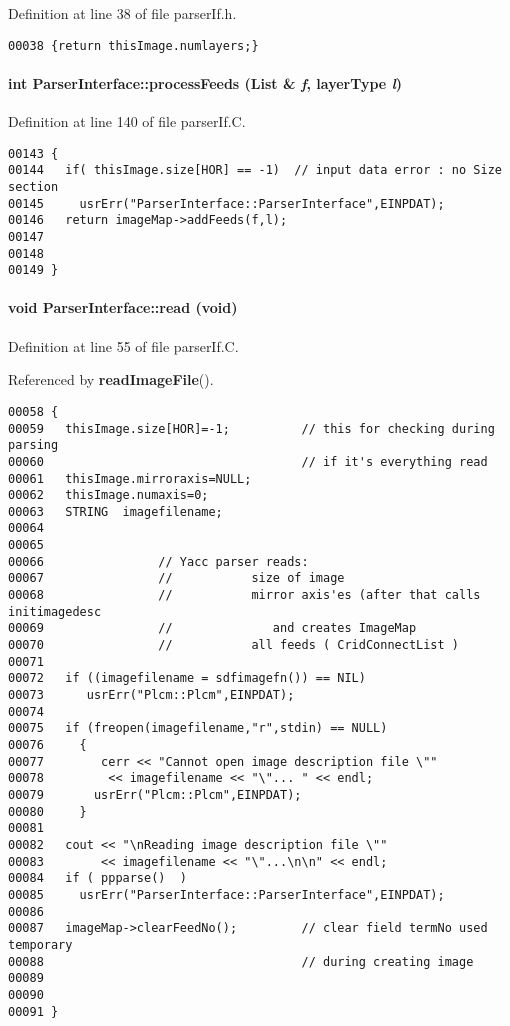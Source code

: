 Definition at line 38 of file parser\-If.h.\small\begin{verbatim}00038 {return thisImage.numlayers;}
\end{verbatim}\normalsize 
\label{ParserInterface_a8}
\paragraph{\setlength{\rightskip}{0pt plus 5cm}int Parser\-Interface::process\-Feeds ({\bf List} \& {\em f}, {\bf layer\-Type} {\em l})}\hfill



Definition at line 140 of file parser\-If.C.\small\begin{verbatim}00143 {
00144   if( thisImage.size[HOR] == -1)  // input data error : no Size section
00145     usrErr("ParserInterface::ParserInterface",EINPDAT);
00146   return imageMap->addFeeds(f,l);
00147 
00148 
00149 }
\end{verbatim}\normalsize 
\label{ParserInterface_a2}
\paragraph{\setlength{\rightskip}{0pt plus 5cm}void Parser\-Interface::read (void)}\hfill



Definition at line 55 of file parser\-If.C.

Referenced by {\bf read\-Image\-File}().\small\begin{verbatim}00058 {
00059   thisImage.size[HOR]=-1;          // this for checking during parsing
00060                                    // if it's everything read
00061   thisImage.mirroraxis=NULL;
00062   thisImage.numaxis=0;
00063   STRING  imagefilename;
00064 
00065 
00066                // Yacc parser reads:
00067                //           size of image
00068                //           mirror axis'es (after that calls initimagedesc
00069                //              and creates ImageMap
00070                //           all feeds ( CridConnectList )
00071 
00072   if ((imagefilename = sdfimagefn()) == NIL)
00073      usrErr("Plcm::Plcm",EINPDAT);
00074 
00075   if (freopen(imagefilename,"r",stdin) == NULL)
00076     {
00077        cerr << "Cannot open image description file \""
00078         << imagefilename << "\"... " << endl;
00079       usrErr("Plcm::Plcm",EINPDAT);      
00080     }
00081 
00082   cout << "\nReading image description file \""
00083        << imagefilename << "\"...\n\n" << endl;
00084   if ( ppparse()  )
00085     usrErr("ParserInterface::ParserInterface",EINPDAT);
00086 
00087   imageMap->clearFeedNo();         // clear field termNo used temporary
00088                                    // during creating image
00089 
00090 
00091 }
\end{verbatim}\normalsize 
\label{ParserInterface_c0}
